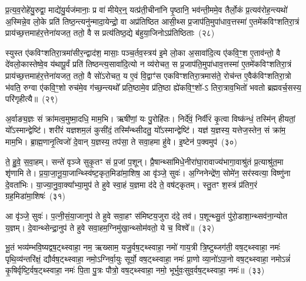 प्र॒त्य॒व॒रोहे॑यु॒रुद्वा॒ माद्ये॑यु॒र्यज॑मानाः॒ प्र वा॑ मीयेर॒न्॒ यत्प्र॑ती॒चीना॑नि पृ॒ष्ठानि॒ भव॑न्ती॒ममे॒व तैर्लो॒कं प्र॒त्यव॑रोह॒न्त्यथो॑ अ॒स्मिन्ने॒व लो॒के प्रति॑ तिष्ठ॒न्त्यनु॑न्मादा॒येन्द्रो॒ वा अप्र॑तिष्ठित आसी॒थ्स प्र॒जा\-प॑ति॒मुपा॑धाव॒त्तस्मा॑ ए॒तमे॑कविꣳशतिरा॒त्रं प्राय॑च्छ॒त्तमाह॑र॒त्तेना॑यजत॒ ततो॒ वै स प्रत्य॑तिष्ठ॒द्ये ब॑हुया॒जिनो\-ऽप्र॑तिष्ठिताः~(२८)

स्युस्त ए॑कविꣳशतिरा॒त्रमा॑सीर॒न्द्वाद॑श॒ मासाः॒ पञ्च॒र्तव॒स्त्रय॑ इ॒मे लो॒का अ॒सावा॑दि॒त्य ए॑कवि॒ꣳ॒श ए॒ताव॑न्तो॒ वै दे॑वलो॒कास्तेष्वे॒व य॑थापू॒र्वं प्रति॑ तिष्ठन्त्य॒सावा॑दि॒त्यो न व्य॑रोचत॒ स प्र॒जा\-प॑ति॒मुपा॑धाव॒त्तस्मा॑ ए॒तमे॑कविꣳशति\-रा॒त्रं प्राय॑च्छ॒त्तमाह॑र॒त्तेना॑यजत॒ ततो॒ वै सो॑\-ऽरोचत॒ य ए॒वं वि॒द्वाꣳ॑स एकविꣳशतिरा॒त्रमास॑ते॒ रोच॑न्त ए॒वैक॑विꣳशतिरा॒त्रो भ॑वति॒ रुग्वा ए॑कवि॒ꣳ॒शो रुच॑मे॒व ग॑च्छ॒न्त्यथो᳚ प्रति॒ष्ठामे॒व प्र॑ति॒ष्ठा ह्ये॑कवि॒ꣳ॒शो॑-\-ऽ तिरा॒त्राव॒भितो॑ भवतो ब्रह्मवर्च॒सस्य॒ परि॑गृहीत्यै॥~(२९)

{\anuvakamend[{गृ॒ह्ण॒न्ति॒ दि॒वा॒की॒र्त्ये॑नै॒वोभ॒यतो॒ नाप्र॑तिष्ठिता॒ आस॑त॒ एक॑विꣳशतिश्च}]}%

अ॒र्वाङ्य॒ज्ञः सं क्रा॑मत्व॒मुष्मा॒दधि॒ माम॒भि। ऋषी॑णां॒ यः पु॒रोहि॑तः। निर्दे॑वं॒ निर्वी॑रं कृ॒त्वा विष्क॑न्धं॒ तस्मि॑न् हीयतां॒ यो᳚\-ऽस्मान्द्वेष्टि॑। शरी॑रं यज्ञशम॒लं कुसी॑दं॒ तस्मि᳚न्थ्सीदतु॒ यो᳚\-ऽस्मान्द्वेष्टि॑। यज्ञ॑ य॒ज्ञस्य॒ यत्तेज॒स्तेन॒ सं क्रा॑म॒ माम॒भि। ब्रा॒ह्म॒णानृ॒त्विजो॑ दे॒वान् य॒ज्ञस्य॒ तप॑सा॒ ते सवा॒हमा हु॑वे। इ॒ष्टेन॑ प॒क्वमुप॑~(३०)

ते॒ हु॒वे॒ स॒वा॒हम्। सन्ते॑ वृञ्जे सुकृ॒तꣳ सं प्र॒जां प॒शून्। प्रै॒षान्थ्सा॑मिधे॒नीरा॑घा॒रावाज्य॑भागा॒वाश्रु॑तं प्र॒त्याश्रु॑त॒मा शृ॑णामि ते। प्र॒या॒जा॒नू॒या॒जान्थ्स्वि॑ष्ट॒कृत॒मिडा॑मा॒शिष॒ आ वृ॑ञ्जे॒ सुवः॑। अ॒ग्निनेन्द्रे॑ण॒ सोमे॑न॒ सर॑स्वत्या॒ विष्णु॑ना दे॒वता॑भिः। या॒ज्या॒नु॒वा॒क्या᳚भ्या॒मुप॑ ते हुवे स्वा॒हं य॒ज्ञमा द॑दे ते॒ वष॑ट्कृतम्। स्तु॒तꣳ श॒स्त्रं प्र॑तिग॒रं ग्रह॒मिडा॑मा॒शिषः॑~(३१)

आ वृ॑ञ्जे॒ सुवः॑। प॒त्नी॒सं॒या॒जानुप॑ ते हुवे सवा॒हꣳ स॑मिष्टय॒जुरा द॑दे॒ तव॑। प॒शून्थ्सु॒तं पु॑रो॒डाशा॒न्थ्सव॑ना॒न्योत य॒ज्ञम्। दे॒वान्थ्सेन्द्रा॒नुप॑ ते हुवे सवा॒हम॒ग्निमु॑खा॒न्थ्सोम॑वतो॒ ये च॒ विश्वे᳚॥~(३२)

{\anuvakamend[{उप॒ ग्रह॒मिडा॑मा॒शिषो॒ द्वात्रिꣳ॑शच्च}]}%

भू॒तं भव्य॑म्भवि॒ष्यद्वष॒ट्थ्\-स्वाहा॒ नम॒ ऋख्साम॒ यजु॒र्वष॒ट्थ्\-स्वाहा॒ नमो॑ गाय॒त्री त्रि॒ष्टुब्जग॑ती॒ वष॒ट्थ्\-स्वाहा॒ नमः॑ पृथि॒व्य॑न्तरि॑क्षं॒ द्यौर्वष॒ट्थ्\-स्वाहा॒ नमो॒\-ऽग्निर्वा॒युः सूर्यो॒ वष॒ट्थ्\-स्वाहा॒ नमः॑ प्रा॒णो व्या॒नो॑\-ऽपा॒नो वष॒ट्थ्\-स्वाहा॒ नमो\-ऽन्नं॑ कृ॒षिर्वृष्टि॒र्वष॒ट्थ्\-स्वाहा॒ नमः॑ पि॒ता पु॒त्रः पौत्रो॒ वष॒ट्थ्\-स्वाहा॒ नमो॒ भूर्भुवः॒सुव॒र्वष॒ट्थ्\-स्वाहा॒ नमः॑॥~(३३)

